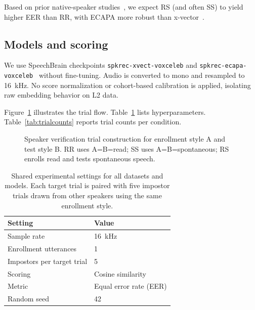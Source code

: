 \documentclass[cameraready]{Interspeech}
\begin{document}
Based on prior native-speaker studies~\cite{tom2010style,wang2020crossstyle}, we expect RS (and often SS) to yield higher EER than RR, with ECAPA more robust than x-vector~\cite{desplanques2020ecapa}.

\subsection{Models and scoring}

We use SpeechBrain checkpoints \texttt{spkrec-xvect-voxceleb} and \texttt{spkrec-ecapa-voxceleb}~\cite{ravanelli2021speechbrain} without fine-tuning. Audio is converted to mono and resampled to \SI{16}{\kilo\hertz}. No score normalization or cohort-based calibration is applied, isolating raw embedding behavior on L2 data.

Figure~\ref{fig:protocol} illustrates the trial flow. Table~\ref{tab:protocol} lists hyperparameters. Table~\ref{tab:trialcounts} reports trial counts per condition.

\begin{figure}[t]
  \centering
  \caption{Speaker verification trial construction for enrollment style A and test style B. RR uses A=B=read; SS uses A=B=spontaneous; RS enrolls read and tests spontaneous speech.}
  \label{fig:protocol}
\end{figure}

\begin{table}[t]
  \caption{Shared experimental settings for all datasets and models. Each target trial is paired with five impostor trials drawn from other speakers using the same enrollment style.}
  \label{tab:protocol}
  \centering
  \begin{tabular}{ll}
    \toprule
    Setting & Value \\
    \midrule
    Sample rate & \SI{16}{\kilo\hertz} \\
    Enrollment utterances & 1 \\
    Impostors per target trial & 5 \\
    Scoring & Cosine similarity \\
    Metric & Equal error rate (EER) \\
    Random seed & 42 \\
    \bottomrule
  \end{tabular}
\end{table}
\end{document}
